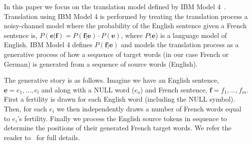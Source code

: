 In this paper we focus on the translation model defined by IBM Model
4~\citep{model4}.  Translation using IBM Model 4 is performed by
treating the translation process a noisy-channel model where the
probability of the English sentence given a French sentence is,
$P(\mathbf{e}|\mathbf{f}) = P(\mathbf{f}|\mathbf{e}) \cdot
P(\mathbf{e})$, where $P(\mathbf{e}$) is a language model of English.
IBM Model 4 defines $P(\mathbf{f}|\mathbf{e})$ and models the
translation process as a generative process of how a sequence of
target words (in our case French or German) is generated from a
sequence of source words (English).

The generative story is as follows.  Imagine we have an English
sentence, $\mathbf{e} = e_1, \dots,e_l$ and along with a NULL word
($e_o$) and French sentence, $\mathbf{f} = f_1, \dots, f_m$.  First a
fertility is drawn for each English word (including the NULL symbol).
Then, for each $e_i$ we then independently draws a number of French
words equal to $e_i$'s fertility.  Finally we process the English
source tokens in sequence to determine the positions of their
generated French target words.  We refer the reader to~\cite{model4}
for full details.



